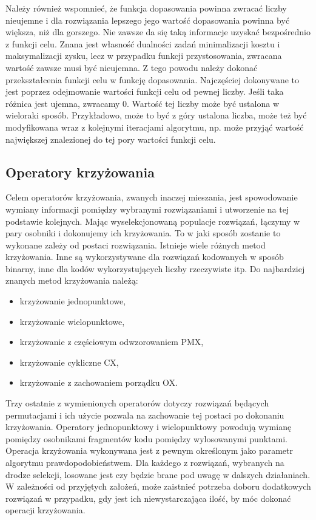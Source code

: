 Należy również wspomnieć, że funkcja dopasowania powinna zwracać liczby nieujemne i dla rozwiązania lepszego jego wartość dopasowania powinna być większa, niż dla gorszego. Nie zawsze da się taką informacje uzyskać bezpośrednio z funkcji celu. Znana jest własność dualności zadań minimalizacji kosztu i maksymalizacji zysku, lecz w przypadku funkcji przystosowania, zwracana wartość zawsze musi być nieujemna. Z tego powodu należy dokonać przekształcenia funkcji celu w funkcję dopasowania. Najczęściej  dokonywane to jest poprzez odejmowanie wartości funkcji celu od pewnej liczby. Jeśli taka różnica jest ujemna, zwracamy 0. Wartość tej liczby może być ustalona w wieloraki sposób. Przykładowo, może to być z góry ustalona liczba, może też być modyfikowana wraz z kolejnymi iteracjami algorytmu, np. może przyjąć wartość największej znalezionej do tej pory wartości funkcji celu.

\subsection{Operatory krzyżowania}
Celem operatorów krzyżowania, zwanych inaczej mieszania, jest spowodowanie wymiany informacji pomiędzy wybranymi rozwiązaniami i utworzenie na tej podstawie kolejnych. Mając wyselekcjonowaną populacje rozwiązań, łączymy w pary osobniki i dokonujemy ich krzyżowania. To w jaki sposób zostanie to wykonane zależy od postaci rozwiązania. Istnieje wiele różnych metod krzyżowania. Inne są wykorzystywane dla rozwiązań kodowanych w sposób binarny, inne dla kodów wykorzystujących liczby rzeczywiste itp. Do najbardziej znanych metod krzyżowania należą:
\begin{itemize}
\item krzyżowanie jednopunktowe,
\item krzyżowanie wielopunktowe,
\item krzyżowanie z częściowym odwzorowaniem PMX,
\item krzyżowanie cykliczne CX,
\item krzyżowanie z zachowaniem porządku OX.
\end{itemize}

Trzy ostatnie z wymienionych operatorów dotyczy rozwiązań będących permutacjami i ich użycie pozwala na zachowanie tej postaci po dokonaniu krzyżowania. Operatory jednopunktowy i wielopunktowy powodują wymianę pomiędzy osobnikami fragmentów kodu pomiędzy wylosowanymi punktami. Operacja krzyżowania wykonywana jest z pewnym określonym jako parametr algorytmu prawdopodobieństwem. Dla każdego z rozwiązań, wybranych na drodze selekcji, losowane jest czy będzie brane pod uwagę w dalszych działaniach. W zależności od przyjętych założeń, może zaistnieć potrzeba doboru dodatkowych rozwiązań w przypadku, gdy jest ich niewystarczająca ilość, by móc dokonać operacji krzyżowania.

